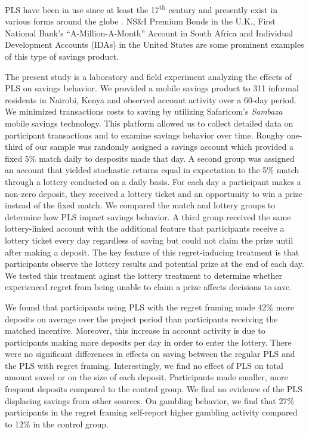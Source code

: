 \documentclass[11pt]{article}
\begin{document}

	PLS have been in use since at least the 17\textsuperscript{th} century and presently exist in various forms around the globe . NS\&I Premium Bonds in the U.K., First National Bank's ``A-Million-A-Month'' Account in South Africa and Individual Development Accounts (IDAs) in the United States are some prominent examples of this type of savings product.


	The present study is a laboratory and field experiment analyzing the effects of PLS on savings behavior. We provided a mobile savings product to 311 informal residents in Nairobi, Kenya and observed account activity over a 60-day period. We minimized transactions costs to saving by utilizing Safaricom's \textit{Sambaza} mobile savings technology. This platform allowed us to collect detailed data on participant transactions and to examine savings behavior over time. Roughy one-third of our sample was randomly assigned a savings account which provided a fixed 5\% match daily to desposits made that day. A second group was assigned an account that yielded stochastic returns equal in expectation to the 5\% match through a lottery conducted on a daily basis. For each day a participant makes a non-zero deposit, they received a lottery ticket and an opportunity to win a prize instead of the fixed match. We compared the match and lottery groups to determine how PLS impact savings behavior. A third group received the same lottery-linked account with the additional feature that participants receive a lottery ticket every day regardless of saving but could not claim the prize until after making a deposit. The key feature of this regret-inducing treatment is that participants observe the lottery results and potential prize at the end of each day. We tested this treatment aginst the lottery treatment to determine whether experienced regret from being unable to claim a prize affects decisions to save.


	We found that participants using PLS with the regret framing made 42\% more deposits on average over the project period than participants receiving the matched incentive. Moreover, this increase in account activity is due to participants making more deposits per day in order to enter the lottery. There were no significant differences in effects on saving between the regular PLS and the PLS with regret framing. Interestingly, we find no effect of PLS on total amount saved or on the size of each deposit. Participants made smaller, more frequent deposits compared to the control group. We find no evidence of the PLS displacing savings from other sources. On gambling behavior, we find that 27\% participants in the regret framing self-report higher gambling activity compared to 12\% in the control group.
\end{document}
